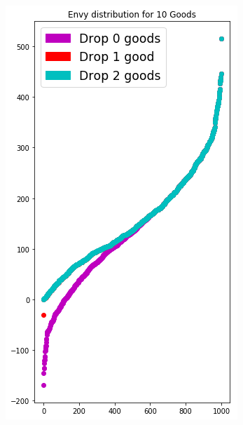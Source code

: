 \begin{figure}[h!]
  \centering
  \begin{subfigure}[b]{0.47\linewidth}
    \includegraphics[width=\linewidth]{images/envy_density/envy_density_uv10.png}
    \caption{}
  \end{subfigure}
  \begin{subfigure}[b]{0.47\linewidth}

\end{subfigure}
\end{figure}
